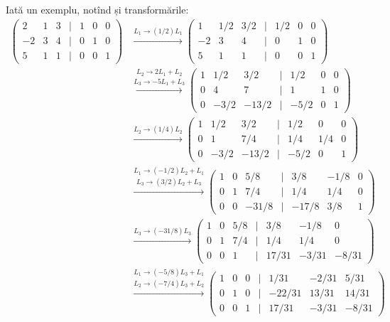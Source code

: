 \documentclass[11pt,a4paper]{article}
\theoremstyle{dotless}
\theoremstyle{dotlessdr}
\begin{document}
Iată un exemplu, notînd și transformările:
\begin{align*}
  \begin{pmatrix}
    2 & 1 & 3 & \mid & 1 & 0 & 0 \\
    -2 & 3 & 4 & \mid & 0 & 1 & 0 \\
    5 & 1 & 1 & \mid & 0 & 0 & 1
  \end{pmatrix} &\xrightarrow{L_1 \to (1/2)L_1}
  \begin{pmatrix}
    1 & 1/2 & 3/2 & \mid & 1/2 & 0 & 0 \\
    -2 & 3 & 4 & \mid & 0 & 1 & 0 \\
    5 & 1 & 1 & \mid & 0 & 0 & 1 
  \end{pmatrix} \\
  &\stackrel{L_2 \to 2L_1 + L_2}{\xrightarrow{L_3 \to -5L_1 + L_3}}
  \begin{pmatrix}
    1 & 1/2 & 3/2 & \mid & 1/2 & 0 & 0 \\
    0 & 4 & 7 & \mid & 1 & 1 & 0 \\
    0 & -3/2 & -13/2 & \mid & -5/2 & 0 & 1
  \end{pmatrix} \\
  &\xrightarrow{L_2 \to (1/4)L_2}
  \begin{pmatrix}
    1 & 1/2 & 3/2 & \mid & 1/2 & 0 & 0 \\
    0 & 1 & 7/4 & \mid & 1/4 & 1/4 & 0 \\
    0 & -3/2 & -13/2 & \mid & -5/2 & 0 & 1 
  \end{pmatrix} \\
  &\stackrel{L_1 \to (-1/2)L_2 + L_1}{\xrightarrow{L_3 \to (3/2)L_2 + L_3}}
  \begin{pmatrix}
    1 & 0 & 5/8 & \mid & 3/8 & -1/8 & 0 \\
    0 & 1 & 7/4 & \mid & 1/4 & 1/4 & 0 \\
    0 & 0 & -31/8 & \mid & -17/8 & 3/8 & 1
  \end{pmatrix} \\
  &\xrightarrow{L_3 \to (-31/8)L_3}
  \begin{pmatrix}
    1 & 0 & 5/8 & \mid & 3/8 & -1/8 & 0 \\
    0 & 1 & 7/4 & \mid & 1/4 & 1/4 & 0 \\
    0 & 0 & 1 & \mid & 17/31 & -3/31 & -8/31
  \end{pmatrix} \\
  &\stackrel{L_1 \to (-5/8)L_3 + L_1}{\xrightarrow{L_2 \to (-7/4)L_3 + L_2}}
  \begin{pmatrix}
    1 & 0 & 0 & \mid & 1/31 & -2/31 & 5/31 \\
    0 & 1 & 0 & \mid & -22/31 & 13/31 & 14/31 \\
    0 & 0 & 1 & \mid & 17/31 & -3/31 & -8/31
  \end{pmatrix}
\end{align*}
\end{document}
